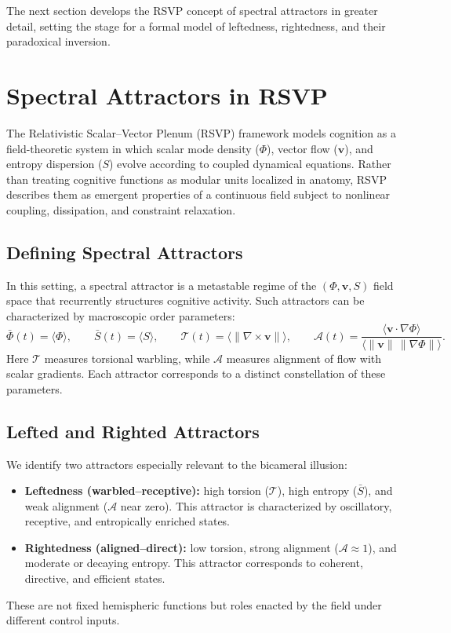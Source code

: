 \documentclass[a4paper,11pt]{article}
\begin{document}
The next section develops the RSVP concept of spectral attractors in greater detail, setting the stage for a formal model of leftedness, rightedness, and their paradoxical inversion.

\section{Spectral Attractors in RSVP}
\label{sec:spectral-attractors}

The Relativistic Scalar--Vector Plenum (RSVP) framework models cognition as a field-theoretic system in which scalar mode density ($\Phi$), vector flow ($\mathbf{v}$), and entropy dispersion ($S$) evolve according to coupled dynamical equations. Rather than treating cognitive functions as modular units localized in anatomy, RSVP describes them as emergent properties of a continuous field subject to nonlinear coupling, dissipation, and constraint relaxation.

\subsection{Defining Spectral Attractors}
In this setting, a spectral attractor is a metastable regime of the $(\Phi,\mathbf{v},S)$ field space that recurrently structures cognitive activity. Such attractors can be characterized by macroscopic order parameters:
\begin{equation}
\bar{\Phi}(t) = \langle \Phi \rangle, \qquad
\bar{S}(t) = \langle S \rangle, \qquad
\mathcal{T}(t) = \big\langle \|\nabla\times \mathbf{v}\|\big\rangle, \qquad
\mathcal{A}(t) = \frac{\langle \mathbf{v}\cdot \nabla \Phi\rangle}{\langle \|\mathbf{v}\|\,\|\nabla \Phi\|\rangle}.
\end{equation}
Here $\mathcal{T}$ measures torsional warbling, while $\mathcal{A}$ measures alignment of flow with scalar gradients. Each attractor corresponds to a distinct constellation of these parameters.

\subsection{Lefted and Righted Attractors}
We identify two attractors especially relevant to the bicameral illusion:
\begin{itemize}
    \item \textbf{Leftedness (warbled--receptive):} high torsion ($\mathcal{T}$), high entropy ($\bar{S}$), and weak alignment ($\mathcal{A}$ near zero). This attractor is characterized by oscillatory, receptive, and entropically enriched states.
    \item \textbf{Rightedness (aligned--direct):} low torsion, strong alignment ($\mathcal{A}\approx 1$), and moderate or decaying entropy. This attractor corresponds to coherent, directive, and efficient states.
\end{itemize}
These are not fixed hemispheric functions but roles enacted by the field under different control inputs.
\end{document}
